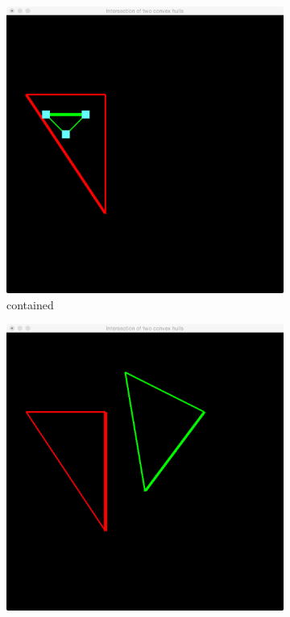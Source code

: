 	\begin{figure}
		\begin{subfigure}{0.3\textwidth}
			\includegraphics[width=\textwidth]{./img/a_contained}
			\caption{contained}
			\label{subfig:a:results:contained}			
		\end{subfigure}
		\begin{subfigure}{0.3\textwidth}
			\includegraphics[width=\textwidth]{./img/a_disjoint}

\end{subfigure}
\end{figure}
